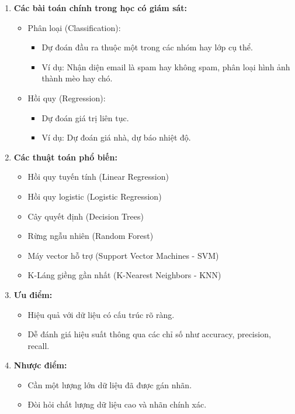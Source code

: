 \documentclass[13pt]{article}
\begin{document}
\begin{enumerate}
\begin{enumerate}
        \item \textbf{Các bài toán chính trong học có giám sát:}
        \begin{itemize}
            \item Phân loại (Classification): 
            \begin{itemize}
                \item Dự đoán đầu ra thuộc một trong các nhóm hay lớp cụ thể.
                \item Ví dụ: Nhận diện email là spam hay không spam, phân loại hình ảnh thành mèo hay chó.
            \end{itemize}
            \item Hồi quy (Regression):
            \begin{itemize}
                \item Dự đoán giá trị liên tục.
                \item Ví dụ: Dự đoán giá nhà, dự báo nhiệt độ.
            \end{itemize}
        \end{itemize}

        \item \textbf{Các thuật toán phổ biến:}
        \begin{itemize}
            \item Hồi quy tuyến tính (Linear Regression)
            \item Hồi quy logistic (Logistic Regression)
            \item Cây quyết định (Decision Trees)
            \item Rừng ngẫu nhiên (Random Forest)
            \item Máy vector hỗ trợ (Support Vector Machines - SVM)
            \item K-Láng giềng gần nhất (K-Nearest Neighbors - KNN)
        \end{itemize}
        \item \textbf{Ưu điểm:}
        \begin{itemize}
            \item Hiệu quả với dữ liệu có cấu trúc rõ ràng.
            \item Dễ đánh giá hiệu suất thông qua các chỉ số như accuracy, precision, recall.
        \end{itemize}
        \item \textbf{Nhược điểm:}
        \begin{itemize}
            \item Cần một lượng lớn dữ liệu đã được gán nhãn.
            \item Đòi hỏi chất lượng dữ liệu cao và nhãn chính xác.
        \end{itemize}
    \end{enumerate}



\end{enumerate}
\end{document}
